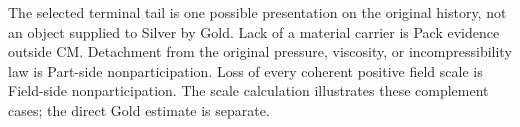 The selected terminal tail is one possible presentation on the original
history, not an object supplied to Silver by Gold.  Lack of a material carrier
is Pack evidence outside CM.  Detachment from the original pressure,
viscosity, or incompressibility law is Part-side nonparticipation.  Loss of
every coherent positive field scale is Field-side nonparticipation.  The scale
calculation illustrates these complement cases; the direct Gold estimate is
separate.
